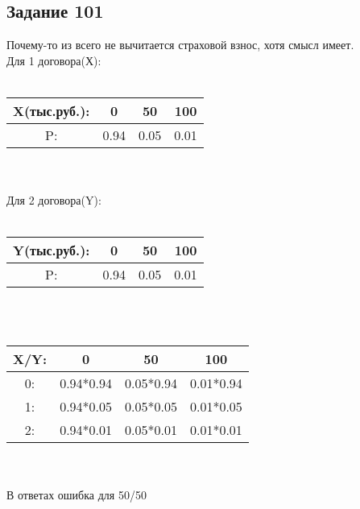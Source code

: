 \documentclass[12pt]{article}
\begin{document}
\subsection{Задание 101}
Почему-то из всего не вычитается страховой взнос, хотя смысл имеет.\\
Для 1 договора(Х):\\
\\
\begin{tabular}{|c|c|c|c|}
\hline
X(тыс.руб.): & 0 & 50& 100  \\
\hline
P: & 0.94 & 0.05 & 0.01 \\
\hline
\end{tabular}
\\
\\
Для 2 договора(Y):\\
\\
\begin{tabular}{|c|c|c|c|}
\hline
Y(тыс.руб.): & 0 & 50& 100  \\
\hline
P: & 0.94 & 0.05 & 0.01 \\
\hline
\end{tabular}
\\
\\
\begin{tabular}{|c|c|c|c|}
\hline
X/Y:  & 0 & 50& 100  \\
\hline
0: &  0.94*0.94 & 0.05*0.94 & 0.01*0.94 \\
\hline
1: & 0.94*0.05 & 0.05*0.05 & 0.01*0.05 \\
\hline
2: &  0.94*0.01 & 0.05*0.01 & 0.01*0.01 \\
\hline
\end{tabular}
\\
\\
В ответах ошибка для 50/50\\
\newpage
\end{document}
